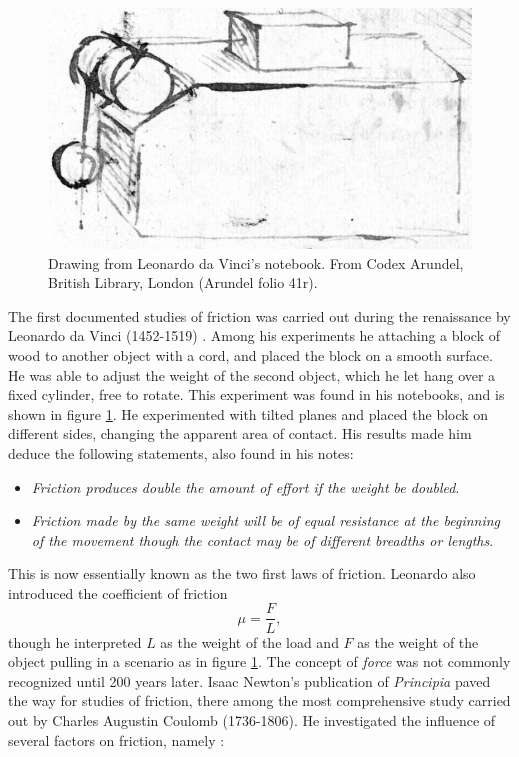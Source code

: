 \documentclass[twoside,english]{uiofysmaster}
\begin{document}
\begin{figure}[H]
	\centering
	\includegraphics[width=0.5\linewidth]{figures/friction/LeonardoDaVinciBW}
	\caption{Drawing from Leonardo da Vinci's notebook. From Codex Arundel, British Library, London (Arundel folio 41r).}
	\label{fig:leonardoDaVinci}
\end{figure}
\noindent 
The first documented studies of friction was carried out during the renaissance by Leonardo da Vinci (1452-1519) \cite{LeonardoDaVinciStudies}.
Among his experiments he attaching a block of wood to another object with a cord, and placed the block on a smooth surface.
He was able to adjust the weight of the second object, which he let hang over a fixed cylinder, free to rotate. 
This experiment was found in his notebooks, and is shown in figure \ref{fig:leonardoDaVinci}.
He experimented with tilted planes and placed the block on different sides, changing the apparent area of contact.
His results made him deduce the following statements, also found in his notes:
\begin{itemize}
	\item[] \textit{Friction produces double the amount of effort if the weight be doubled}. 
	\item[] \textit{Friction made by the same weight will be of equal resistance at the beginning of the movement though the contact may be of different breadths or lengths}.
\end{itemize}
This is now essentially known as the two first laws of friction. 
Leonardo also introduced the coefficient of friction 
\begin{equation}
	\mu = \frac{F}{L}, \label{eq:coefficientOfFriction}
\end{equation}
though he interpreted $L$ as the weight of the load and $F$ as the weight of the object pulling in a scenario as in figure \ref{fig:leonardoDaVinci}. The concept of \textit{force} was not commonly recognized until 200 years later. Isaac Newton's publication of \textit{Principia} paved the way for studies of friction, there among the most comprehensive study carried out by Charles Augustin Coulomb (1736-1806). He investigated the influence of several factors on friction, namely \cite{SlidingFriction}:
\end{document}
